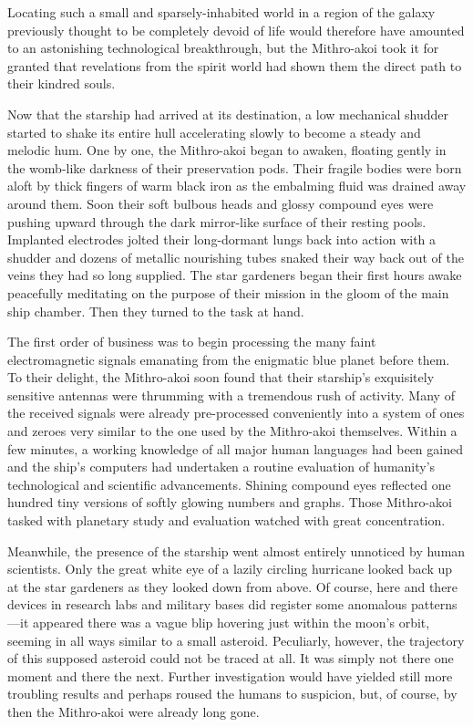 \documentclass[12pt]{article}
\begin{document}
Locating such a small and sparsely-inhabited world in a region of the galaxy previously thought to be completely devoid of life would therefore have amounted to an astonishing technological breakthrough, 
but the Mithro-akoi took it for granted that revelations from the spirit world had shown them the direct path to their kindred souls.

Now that the starship had arrived at its destination, a low mechanical shudder started to shake its entire hull
accelerating slowly to become a steady and melodic hum.
One by one, the Mithro-akoi began to awaken,
floating gently in the womb-like darkness of their preservation pods.
Their fragile bodies were born aloft by thick fingers of warm black iron as the embalming fluid was drained away around them.
Soon their soft bulbous heads and glossy compound eyes were pushing upward through the dark mirror-like surface of their resting pools.
Implanted electrodes jolted their long-dormant lungs back into action with a shudder and dozens of metallic nourishing tubes snaked their way back out of the veins they had so long supplied.
The star gardeners began their first hours awake peacefully meditating on the purpose of their mission in the gloom of the main ship chamber.
Then they turned to the task at hand.

The first order of business was to begin processing the many faint electromagnetic signals emanating from the enigmatic blue planet before them.
To their delight, the Mithro-akoi soon found that their starship's exquisitely sensitive antennas were thrumming with a tremendous rush of activity.
Many of the received signals were already pre-processed conveniently into a system of ones and zeroes very similar to the one used by the Mithro-akoi themselves.
Within a few minutes, a working knowledge of all major human languages had been gained and the ship's computers had undertaken a routine evaluation of humanity's technological and scientific advancements.
Shining compound eyes reflected one hundred tiny versions of softly glowing numbers and graphs. 
Those Mithro-akoi tasked with planetary study and evaluation watched with great concentration.

Meanwhile, the presence of the starship went almost entirely unnoticed by human scientists.
Only the great white eye of a lazily circling hurricane looked back up at the star gardeners as they looked down from above.
Of course, here and there devices in research labs and military bases did register some anomalous patterns---it appeared there was a vague blip hovering just within the moon's orbit, 
seeming in all ways similar to a small asteroid. 
Peculiarly, however, the trajectory of this supposed asteroid could not be traced at all.
It was simply not there one moment and there the next.
Further investigation would have yielded still more troubling results
and perhaps roused the humans to suspicion, 
but, of course, by then the Mithro-akoi were already long gone.
\end{document}
